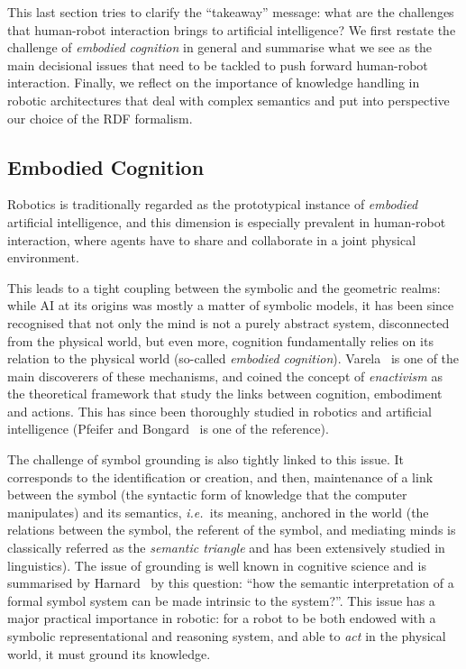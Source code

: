 \documentclass[preprint,3p,times]{elsarticle}
\newcommand{\ie}{{\textit{i.e.\ }}}
\begin{document}
This last section tries to clarify the ``takeaway'' message: what are the
challenges that human-robot interaction brings to artificial intelligence?  We
first restate the challenge of \emph{embodied cognition} in general and
summarise what we see as the main decisional issues that need to be tackled to
push forward human-robot interaction. Finally, we reflect on the importance of
knowledge handling in robotic architectures that deal with complex semantics and
put into perspective our choice of the RDF formalism. 

\subsection{Embodied Cognition}

Robotics is traditionally regarded as the prototypical instance of
\emph{embodied} artificial intelligence, and this dimension is especially
prevalent in human-robot interaction, where agents have to share and collaborate
in a joint physical environment.

This leads to a tight coupling between the symbolic and the geometric realms:
while AI at its origins was mostly a matter of symbolic models, it has been
since recognised that not only the mind is not a purely abstract system,
disconnected from the physical world, but even more, cognition fundamentally
relies on its relation to the physical world (so-called \emph{embodied
cognition}). Varela~\cite{Varela1992} is one of the main discoverers of these
mechanisms, and coined the concept of \emph{enactivism} as the theoretical
framework that study the links between cognition, embodiment and actions.  This
has since been thoroughly studied in robotics and artificial intelligence
(Pfeifer and Bongard~\cite{pfeifer2007body} is one of the reference).

The challenge of symbol grounding is also tightly linked to this issue. It
corresponds to the identification or creation, and then, maintenance of a link
between the symbol (the syntactic form of knowledge that the computer
manipulates) and its semantics, \ie its meaning, anchored in the world (the
relations between the symbol, the referent of the symbol, and mediating minds
is classically referred as the \emph{semantic triangle} and has been
extensively studied in linguistics). The issue of grounding is well known in
cognitive science and is summarised by Harnard~\cite{Harnad1990} by this
question: ``how the semantic interpretation of a formal symbol system can be
made intrinsic to the system?''. This issue has a major practical importance in
robotic: for a robot to be both endowed with a symbolic representational and
reasoning system, and able to \emph{act} in the physical world, it must ground
its knowledge.
\end{document}
